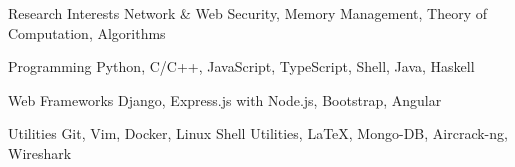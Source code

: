 


\begin{cvskills}

  \cvskill
  {Research Interests}
  {Network \& Web Security, Memory Management, Theory of Computation, Algorithms}  
  
  \cvskill
  {Programming}
  {Python, C/C++, JavaScript, TypeScript, Shell, Java, Haskell}


  \cvskill
  {Web Frameworks}
  {Django, Express.js with Node.js, Bootstrap, Angular}

  \cvskill
  {Utilities}
  {Git, Vim, Docker, Linux Shell Utilities, \LaTeX, Mongo-DB, Aircrack-ng, Wireshark}


\end{cvskills}

